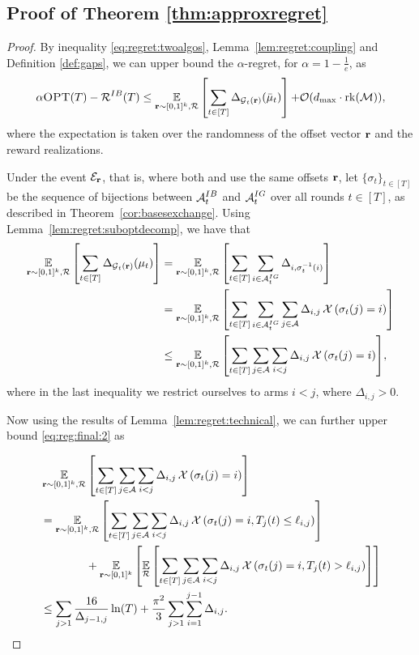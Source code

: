 \subsection{Proof of Theorem \ref{thm:approxregret}}

\restateApproxRegret*

\begin{proof}
By inequality \eqref{eq:regret:twoalgos}, Lemma~\ref{lem:regret:coupling} and Definition \ref{def:gaps}, we can upper bound the $\alpha$-regret, for $\alpha = 1 - \frac{1}{e}$, as
\begin{align}
\alpha \textsc{OPT}(T) - \operatorname{\mathcal{R}}^{IB}(T) \leq \mathop{\underset{\operatorname{\mathbf{r}} \sim [0,1]^k, \mathcal{R}}{\mathbb{E}}\left[\sum_{t \in [T]}\Delta_{\operatorname{\mathcal{G}}_t(\operatorname{\mathbf{r}})}(\bar{\mu}_t)\right]} + \mathcal{O}(d_{\max}\cdot \operatorname{rk}(\operatorname{\mathcal{M}})), \label{eq:reg:final:1}
\end{align}
where the expectation is taken over the randomness of the offset vector $\operatorname{\mathbf{r}}$ and the reward realizations.

Under the event $\mathcal{E}_{\operatorname{\mathbf{r}}}$, that is, where both \IG and \UCB use the same offsets $\operatorname{\mathbf{r}}$, let $\{\sigma_t\}_{t \in [T]}$ be the sequence of bijections between $\operatorname{\mathcal{A}}_t^{IB}$ and $\operatorname{\mathcal{A}}_t^{IG}$ over all rounds $t \in [T]$, as described in Theorem~\ref{cor:basesexchange}. Using Lemma~\ref{lem:regret:suboptdecomp}, we have that
\begin{align}
    \mathop{\underset{\operatorname{\mathbf{r}} \sim [0,1]^k, \mathcal{R}}{\mathbb{E}}\left[\sum_{t \in [T]}\Delta_{\operatorname{\mathcal{G}}_t(\operatorname{\mathbf{r}})}(\mu_t)\right]} 
    &= \mathop{\underset{\operatorname{\mathbf{r}} \sim [0,1]^k, \mathcal{R}}{\mathbb{E}}\left[\sum_{t \in [T]}\sum_{i \in \operatorname{\mathcal{A}}^{IG}_t} \Delta_{i , \sigma^{-1}_{t}(i)}\right]}\notag \\
    &= \mathop{\underset{\operatorname{\mathbf{r}} \sim [0,1]^k, \mathcal{R}}{\mathbb{E}}\left[\sum_{t \in [T]}\sum_{i \in \operatorname{\mathcal{A}}^{IG}_t}
    \sum_{j \in \operatorname{\mathcal{A}}} \Delta_{i,j} \mathop{\mathcal{X}\left(\sigma_t(j) = i\right)}\right]}\notag\\
    &\leq \mathop{\underset{\operatorname{\mathbf{r}} \sim [0,1]^k, \mathcal{R}}{\mathbb{E}}\left[\sum_{t \in [T]}\sum_{j \in \operatorname{\mathcal{A}}}\sum_{i < j}
    \Delta_{i,j} \mathop{\mathcal{X}\left(\sigma_t(j) = i\right)}\right]}, \label{eq:reg:final:2}
\end{align}
where in the last inequality we restrict ourselves to arms $i < j$, where $\Delta_{i,j}>0$.

Now using the results of Lemma~\ref{lem:regret:technical}, we can further upper bound \eqref{eq:reg:final:2} as 

\begin{align}
&\mathop{\underset{\operatorname{\mathbf{r}} \sim [0,1]^k, \mathcal{R}}{\mathbb{E}}\left[\sum_{t \in [T]}\sum_{j \in \operatorname{\mathcal{A}}}\sum_{i < j} \Delta_{i,j} \mathop{\mathcal{X}\left(\sigma_t(j) = i\right)}\right]} \notag \\
&= \mathop{\underset{\operatorname{\mathbf{r}} \sim [0,1]^k, \mathcal{R}}{\mathbb{E}}\left[\sum_{t \in [T]}\sum_{j \in \operatorname{\mathcal{A}}}\sum_{i < j} \Delta_{i,j} \mathop{\mathcal{X}\left(\sigma_t(j) = i, T_j(t) \leq \ell_{i,j}\right)}\right]} \notag\\
&\qquad \qquad+ \mathop{\underset{\operatorname{\mathbf{r}} \sim [0,1]^k}{\mathbb{E}}\left[ \mathop{\underset{\mathcal{R}}{\mathbb{E}}\left[\sum_{t \in [T]}\sum_{j \in \operatorname{\mathcal{A}}}\sum_{i < j} \Delta_{i,j} \mathop{\mathcal{X}\left(\sigma_t(j) = i, T_j(t) > \ell_{i,j}\right)}\right]}\right]} \notag \\
&\leq \sum_{j > 1} \frac{16}{\Delta_{j-1,j}}\ln(T) + \frac{\pi^2}{3} \sum_{j > 1}\sum_{i = 1}^{j-1} \Delta_{i,j}. \label{eq:reg:final:3}
\end{align}


\end{proof}
